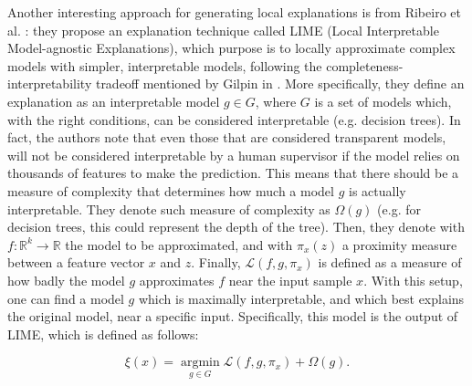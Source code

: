 Another interesting approach for generating local explanations is from Ribeiro et al. \cite{ribeiro2016trust}: they propose an explanation technique called LIME (Local Interpretable Model-agnostic Explanations), which purpose is to locally approximate complex models with simpler, interpretable models, following the completeness-interpretability tradeoff mentioned by Gilpin in \cite{gilpin2018explaining}
. More specifically, they define an explanation as an interpretable model $g \in G$, where $G$ is a set of models which, with the right conditions, can be considered interpretable (e.g. decision trees). In fact, the authors note that even those that are considered transparent models, will not be considered interpretable by a human supervisor if the model relies on thousands of features to make the prediction. This means that there should be a measure of complexity that determines how much a  model $g$ is actually interpretable. They denote such measure of complexity as $\Omega(g)$ (e.g. for decision trees, this could represent the depth of the tree). Then, they denote with $f:\mathbb{R}^k\rightarrow \mathbb{R}$ the model to be approximated, and with $\pi _x (z)$ a proximity measure between a feature vector $x$ and $z$. Finally, $\mathcal{L}(f,g,\pi_x)$ is defined as a measure of how badly the model $g$ approximates $f$ near the input sample $x$. With this setup, one can find a model $g$ which is maximally interpretable, and which best explains the original model, near a specific input. Specifically, this model is the output of LIME, which is defined as follows:

$$\xi(x)=\underset{g \in G}{\operatorname{argmin}} \mathcal{L}\left(f, g, \pi_{x}\right)+\Omega(g).$$

